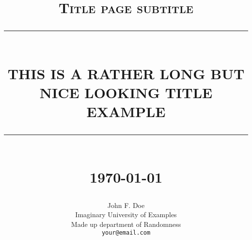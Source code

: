 \documentclass[paper=a4, fontsize=11pt,twoside]{scrartcl}		%
\begin{document}
\newcommand{\HRule}[1]{\rule{\linewidth}{#1}} 	%

\makeatletter							%
\def\printtitle{%
    {\centering \@title\par}}
\makeatother									

\makeatletter							%
\def\printauthor{%
    {\centering \large \@author}}				
\makeatother							

\title{	\normalsize \textsc{Title page subtitle} 	%
		 	\\[2.0cm]													%
			\HRule{0.5pt} \\										%
			\LARGE \textbf{\uppercase{This is a rather long but nice looking title example}}	%
			\HRule{2pt} \\ [0.5cm]								%
			\normalsize \today									%
		}

\author{
		John F. Doe\\	
		Imaginary University of Examples\\	
		Made up department of Randomness\\
        \texttt{your@email.com} \\
}























\end{document}
